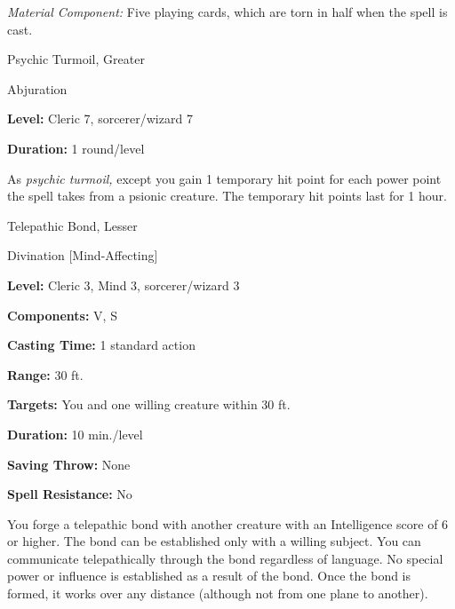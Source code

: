 \documentclass{article}
\begin{document}
\textit{Material Component: }Five playing cards, which are torn in half when the 
spell is cast.

\vspace{12pt}
Psychic Turmoil, Greater

Abjuration

\textbf{Level:} Cleric 7, sorcerer/wizard 7

\textbf{Duration: }1 round/level

As \textit{psychic turmoil, }except you gain 1 temporary hit point for each power 
point the spell takes from a psionic creature. The temporary hit points last for 
1 hour.

\vspace{12pt}
Telepathic Bond, Lesser

Divination [Mind-Affecting]

\textbf{Level:} Cleric 3, Mind 3, sorcerer/wizard 3

\textbf{Components: }V, S

\textbf{Casting Time: }1 standard action

\textbf{Range:} 30 ft.

\textbf{Targets:} You and one willing creature within 30 ft.

\textbf{Duration:} 10 min./level

\textbf{Saving Throw:} None

\textbf{Spell Resistance:} No

You forge a telepathic bond with another creature with an Intelligence score of 
6 or higher. The bond can be established only with a willing subject. You can communicate 
telepathically through the bond regardless of language. No special power or influence 
is established as a result of the bond. Once the bond is formed, it works over 
any distance (although not from one plane to another).

\newpage
\end{document}
